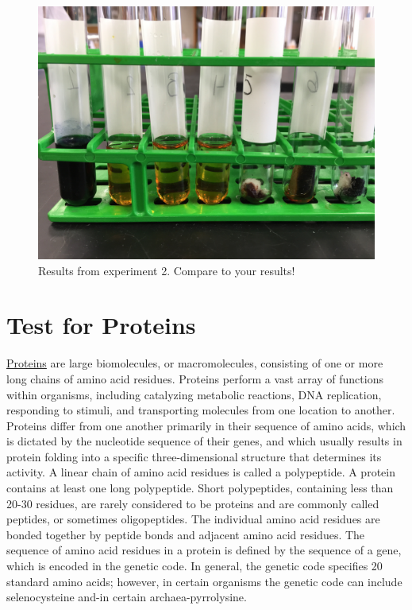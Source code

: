 \begin{figure}

{\centering \includegraphics[width=0.7\linewidth]{./figures/chem_aspects/Results_exp_2}

}

\caption{Results from experiment 2. Compare to your results!}\label{fig:exp2}
\end{figure}

\section{Test for Proteins}\label{test-for-proteins}

\href{https://en.wikipedia.org/wiki/Protein}{Proteins} are large
biomolecules, or macromolecules, consisting of one or more long chains
of amino acid residues. Proteins perform a vast array of functions
within organisms, including catalyzing metabolic reactions, DNA
replication, responding to stimuli, and transporting molecules from one
location to another. Proteins differ from one another primarily in their
sequence of amino acids, which is dictated by the nucleotide sequence of
their genes, and which usually results in protein folding into a
specific three-dimensional structure that determines its activity. A
linear chain of amino acid residues is called a polypeptide. A protein
contains at least one long polypeptide. Short polypeptides, containing
less than 20-30 residues, are rarely considered to be proteins and are
commonly called peptides, or sometimes oligopeptides. The individual
amino acid residues are bonded together by peptide bonds and adjacent
amino acid residues. The sequence of amino acid residues in a protein is
defined by the sequence of a gene, which is encoded in the genetic code.
In general, the genetic code specifies 20 standard amino acids; however,
in certain organisms the genetic code can include selenocysteine and-in
certain archaea-pyrrolysine.

